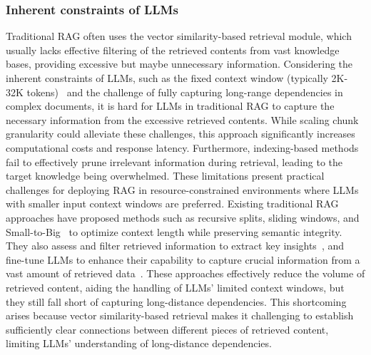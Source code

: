 \documentclass[lettersize,journal]{IEEEtran}
\begin{document}
\subsubsection{Inherent constraints of LLMs}
Traditional RAG often uses the vector similarity-based retrieval module, which usually lacks effective filtering of the retrieved contents from vast knowledge bases, providing excessive but maybe unnecessary information. Considering the inherent constraints of LLMs, such as the fixed context window (typically 2K-32K tokens)~\cite{openai2023gpt4,anthropic2024claude} and the challenge of fully capturing long-range dependencies in complex documents, it is hard for LLMs in traditional RAG to capture the necessary information from the excessive retrieved contents. While scaling chunk granularity could alleviate these challenges, this approach significantly increases computational costs and response latency. Furthermore, indexing-based methods fail to effectively prune irrelevant information during retrieval, leading to the target knowledge being overwhelmed. These limitations present practical challenges for deploying RAG in resource-constrained environments where LLMs with smaller input context windows are preferred. Existing traditional RAG approaches have proposed methods such as recursive splits, sliding windows, and Small-to-Big~\cite{wang2024searchingforbestpractivesinrag,llamaindex_website} to optimize context length while preserving semantic integrity. They also assess and filter retrieved information to extract key insights~\cite{arefeen2024leancontext,asai2023self,wang2023learning,lyu2023improving}, and fine-tune LLMs to enhance their capability to capture crucial information from a vast amount of retrieved data~\cite{luo2023sail}. These approaches effectively reduce the volume of retrieved content, aiding the handling of LLMs' limited context windows, but they still fall short of capturing long-distance dependencies. This shortcoming arises because vector similarity-based retrieval makes it challenging to establish sufficiently clear connections between different pieces of retrieved content, limiting LLMs' understanding of long-distance dependencies.
\end{document}
